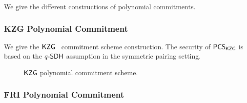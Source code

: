 We give the different constructions of polynomial commitments.


\subsubsection{KZG Polynomial Commitment}

We give the $\mathsf{KZG}$~\cite{AC:KatZavGol10} commitment scheme construction. The security of $\mathsf{PCS}_{\mathsf{KZG}}$ is based on the $q\text{-}\mathsf{SDH}$ assumption in the symmetric pairing setting.

\begin{figure}[ht!]%
	\centering%
	\nicoresetlinenr
	\caption{$\mathsf{KZG}$ polynomial commitment scheme.}
	\label{const:KZG-commit}
\end{figure}


\subsubsection{FRI Polynomial Commitment}

\subsubsection{}